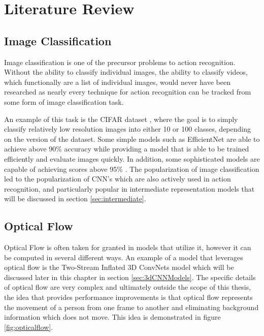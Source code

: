 
\chapter{Literature Review} %

\label{LiteratureReview} %

\section{Image Classification}

Image classification is one of the precursor problems to action recognition. Without the ability to classify individual images, the ability to classify videos, which functionally are a list of individual images, would never have been researched as nearly every technique for action recognition can be tracked from some form of image classification task.

An example of this task is the CIFAR dataset \cite{cifar}, where the goal is to simply classify relatively low resolution images into either 10 or 100 classes, depending on the version of the dataset. Some simple models such as EfficientNet \cite{efficientnet} are able to achieve above 90\% accuracy while providing a model that is able to be trained efficiently and evaluate images quickly. In addition, some sophisticated models are capable of achieving scores above 95\% \cite{cifar100_modern1} \cite{cifar100_modern2}. The popularization of image classification led to the popularization of CNN's which are also actively used in action recognition, and particularly popular in intermediate representation models that will be discussed in section \ref{sec:intermediate}.

\section{Optical Flow}

Optical Flow is often taken for granted in models that utilize it, however it can be computed in several different ways. An example of a model that leverages optical flow is the Two-Stream Inflated 3D ConvNets model \cite{i3d} which will be discussed later in this chapter in section \ref{sec:3dCNNModels}. The specific details of optical flow are very complex and ultimately outside the scope of this thesis, the idea that provides performance improvements is that optical flow represents the movement of a person from one frame to another and eliminating background information which does not move. This idea is demonstrated in figure \ref{fig:opticalflow}.

